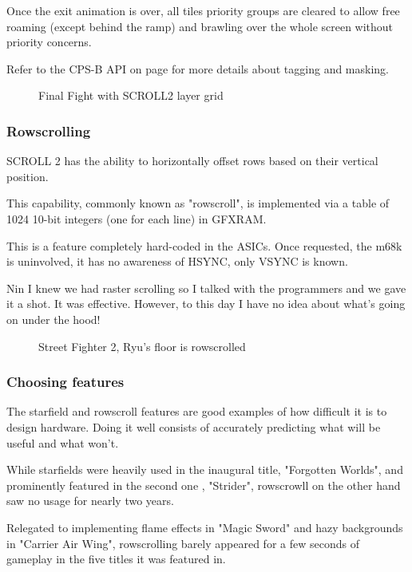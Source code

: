 Once the exit animation is over, all tiles priority groups are cleared to allow free roaming (except behind the ramp) and brawling over the whole screen without priority concerns.

Refer to the CPS-B API on page \pageref{cpsbreg_programming} for more details about tagging and masking.
\vfill
\begin{figure}[!b]
 \caption*{Final Fight with SCROLL2 layer grid}%
 \end{figure}%
\pagebreak

\subsubsection{Rowscrolling}
SCROLL 2 has the ability to horizontally offset rows based on their vertical position. 

This capability, commonly known as "rowscroll", is implemented via a table of 1024 10-bit integers (one for each line) in GFXRAM.

This is a feature completely hard-coded in the ASICs. Once requested, the m68k is uninvolved, it has no awareness of HSYNC, only VSYNC is known.

\begin{q}{Nin}
I knew we had raster scrolling so I talked with the programmers and we gave it a shot.  It was effective. However, to this day I have no idea about what's going on under the hood!
\end{q}

\vfill
\begin{figure}[!b]
 \caption*{Street Fighter 2, Ryu's floor is rowscrolled}%
 \end{figure}%
\pagebreak

\subsubsection{Choosing features}

The starfield and rowscroll features are good examples of how difficult it is to design hardware. Doing it well consists of accurately predicting what will be useful and what won't. 

While starfields were heavily used in the inaugural title, "Forgotten Worlds", and prominently featured in the second one , "Strider", rowscrowll on the other hand saw no usage for nearly two years. 

Relegated to implementing flame effects in "Magic Sword" and hazy backgrounds in "Carrier Air Wing", rowscrolling barely appeared for a few seconds of gameplay in the five titles\cite{mame_cps1_video} it was featured in.

